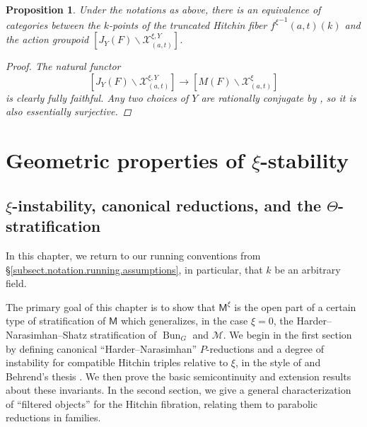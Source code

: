 \documentclass[openany]{amsbook}
\newtheorem{proposition}[theorem]{Proposition}
\theoremstyle{definition}
\theoremstyle{remark}
\numberwithin{equation}{section}
\newcommand{\cM}{\mathcal{M}}
\newcommand{\cX}{\mathcal{X}}
\renewcommand{\-}{\operatorname{-}}
\newcommand{\on}[1]{\operatorname{#1}}
\newcommand{\bM}{\mathsf{M}}
\begin{document}
\begin{proposition}\label{prop.adelic.hitchin.fiber.reduced.kostant}
    Under the notations as above, there is an equivalence of categories between the $k$-points of the truncated Hitchin fiber ${f^{\xi}}^{-1}(a,t)(k)$ and the action groupoid $[J_{Y}(F) \backslash \cX_{(a,t)}^{\xi, Y}]$.
    \begin{proof}
        The natural functor 
        $$
            [J_{Y}(F) \backslash \cX_{(a,t)}^{\xi, Y}] \to [M(F) \backslash \cX^{\xi}_{(a,t)}]
        $$
        is clearly fully faithful. Any two choices of $Y$ are rationally conjugate by \cite[Lemme 3.8.1]{CLI}, so it is also essentially surjective.
    \end{proof}
\end{proposition}




















\part{\texorpdfstring{Geometric properties of $\xi$-stability}{Geometric properties of xi-stability}}

\chapter{\texorpdfstring{$\xi$-instability, canonical reductions, and the $\Theta$-stratification}{xi-instability, canonical reductions, and the theta-stratification}}\label{sect.can.red}

In this chapter, we return to our running conventions from \S \ref{subsect.notation.running.assumptions}, in particular, that $k$ be an arbitrary field.

The primary goal of this chapter is to show that $\bM^\xi$ is the open part of a certain type of stratification of $\bM$ which generalizes, in the case $\xi = 0$, the Harder--Narasimhan--Shatz stratification of $\on{Bun}_G$ and $\cM$. We begin in the first section by defining canonical ``Harder--Narasimhan'' $P$-reductions and a degree of instability for compatible Hitchin triples relative to $\xi$, in the style of \cite{CLI} and Behrend's thesis \cite{behrendthesis}. We then prove the basic semicontinuity and extension results about these invariants. In the second section, we give a general characterization of ``filtered objects'' for the Hitchin fibration, relating them to parabolic reductions in families.
\end{document}
